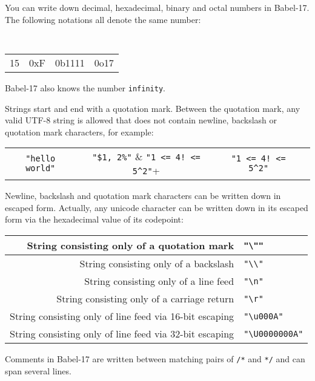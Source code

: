 \documentclass[11pt]{amsart}
\newcommand{\babelsrc}[1] {\lstinline!#1!}
\begin{document}
You can write down decimal, hexadecimal, binary and octal numbers in Babel-17. The following notations all denote the same number:
\begin{center}
\tt
\begin{tabular}{cccc}
15 & 0xF & 0b1111 &  0o17
\end{tabular}
\end{center}
Babel-17 also knows the number \babelsrc{infinity}.

Strings start and end with a quotation mark. Between the quotation mark, any valid UTF-8 string is allowed that does not contain newline, backslash or quotation mark characters, for example:
\begin{center}
\begin{tabular}{cccc}
\verb+"hello world"+ & \verb+"$1, 2%"+ & \verb+"1 <= 4! <= 5^2"+
\end{tabular}
\end{center}
Newline, backslash and quotation mark characters can be written down in escaped form. Actually, any unicode character can be written down in its escaped form via the hexadecimal value of its codepoint: 
\begin{center}
\begin{tabular}{r|l}
String consisting only of a quotation mark & \verb+"\""+\\\hline
String consisting only of a backslash & \verb+"\\"+ \\\hline
String consisting only of a line feed & \verb+"\n"+ \\\hline
String consisting only of a carriage return & \verb+"\r"+ \\\hline
String consisting only of line feed via 16-bit escaping & \verb+"\u000A"+ \\\hline
String consisting only of line feed via 32-bit escaping & \verb+"\U0000000A"+
\end{tabular}
\end{center}

Comments in Babel-17 are written between matching pairs of \verb+/*+ and \verb+*/+ and can span several lines.
\end{document}
